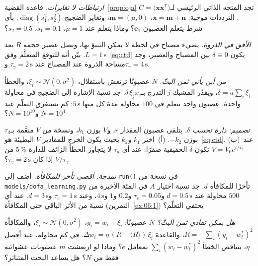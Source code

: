 \begin{exercise}[\lvlB]
\label{ex:06:3}
\emph{ارتباطات لا تغايرات.} قاعدة القضية~\ref{prop:oja} تجد المتجه الذاتي الرئيسي لـ$C=\langle\mathbf x\mathbf x^{\mathsf T}\rangle$. الترددات موجبة: $\mathbf x=\mathbf m+\mathbf n$، $\mathbf m=(\mu,0)$، وتغاير الضجيج $\operatorname{diag}(s_1^2,s_2^2)$. بأي شرط يتعلم العصبون $\mathbf e_1$؟ وماذا يتعلم عند $\mu=1$، $s_1=0.1$، $s_2=0.5$؟
\end{exercise}

\begin{exercise}[\lvlA]
\label{ex:06:4}
\emph{الأفق في الذروة.} يضيء مصباح في لحظة لا يمكن التنبؤ بها، ويصل عصير حجمه $R$ بعد $L=1\,\text{s}$. بيّن أنه للتوقع المتعلَّم وفق~\eqref{eq:ctd} يكون $\delta\equiv0$ بين المصباح والعصير، وجد مساحة الذروة عند المصباح عند $\tau_\gamma=2\,\text{s}$ و$\tau_\gamma=4\,\text{s}$.
\end{exercise}

\begin{exercise}[\lvlB]
\label{ex:06:5}
\emph{من أين يأتي ثمن البثّ.} $N$ عصبونًا ترتعش باستقلال، $\xi_i\sim\mathcal N(0,\sigma^2)$، والخطأ $\delta=a\sum_i\xi_i$، ويقدّر المشبك $j$ التدرج بـ$\delta\,\xi_jx_j$. جد نسبة الإشارة إلى الضجيج في محاولة واحدة. عصبون واحد يتعلم في $100$ محاولة مدة كل منها $5\,\text{s}$: كم يستغرق التعلّم عند $N=10^4$ و$N=10^{10}$؟
\end{exercise}

\begin{exercise}[\lvlB]
\label{ex:06:6}
\emph{تصميم: دارة تحسب $\delta$.} يتلقى عصبون  المقدار $r$، و$V$ بوزن $k_1$، ونسخة من $V$ منعَّمة بـ$\tau_d$ بوزن $-k_2$. (أ)~اختر $k_1$ و$k_2$ بحيث يكون الخرج للمقادير $V$ البطيئة هو~\eqref{eq:ctd}. (ب)~عند $V=V_0e^{t/\tau_\gamma}$ تكون $\delta$ الحقيقية صفرًا. عند أي $\tau_d$ لا يتجاوز الخطأ الزائف للدارة $5\,\%$ من $V/\tau_\gamma$ إذا كان $\tau_\gamma=2\,\text{s}$؟
\end{exercise}

\begin{exercise}[\lvlB]
\label{ex:06:7}
\emph{نمذجة: أقصى تأخر للمكافأة.} أضف إلى \texttt{run()} في نسخة من \texttt{models/\allowbreak dofa\_learning.py} تأخرًا للمكافأة $d$. جد نسبة اختيار $A$ في المئة الأخيرة من $500$ محاولة عند $d=0.5\,\text{s}$ و$\tau_e=0.05$ و$0.2$ و$1$ و$4\,\text{s}$، وعند $\tau_e=1\,\text{s}$ و$d=3\,\text{s}$. عند أي نسبة من الأثر الباقي حتى المكافأة (التمرين~\ref{ex:06:1}) يختفي التعلّم؟
\end{exercise}

\begin{exercise}[\lvlC]
\label{ex:06:8}
\emph{هل يمكن تفادي ثمن البثّ؟} $N$ عصبونًا: $y_i=w_i+\xi_i$، $\xi_i\sim\mathcal N(0,\sigma^2)$، والمكافأة $R=-\sum_i(y_i-w_i^*)^2$، والقاعدة $\Delta w_i=\eta\,(R-\langle R\rangle)\,\xi_i$. في كم محاولة، عند أفضل $\eta$، يتناقص الخطأ $\sum_i(w_i-w_i^*)^2$ بمعامل $e$؟ وماذا لو ارتعشت $m$ عصبونات عشوائية فقط من $N$؟ هل يساعد البحث المتناثر؟
\end{exercise}
